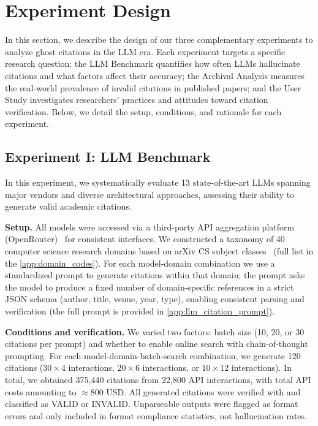 \section{Experiment Design}
\label{subsec:experiment_design}

In this section, we describe the design of our three complementary experiments to analyze ghost citations in the LLM era. Each experiment targets a specific research question: the LLM Benchmark quantifies how often LLMs hallucinate citations and what factors affect their accuracy; the Archival Analysis measures the real-world prevalence of invalid citations in published papers; and the User Study investigates researchers' practices and attitudes toward citation verification. 
Below, we detail the setup, conditions, and rationale for each experiment.

\subsection{Experiment I: LLM Benchmark}
\label{subsec:experiment_i}

In this experiment, we systematically evaluate 13 state-of-the-art LLMs spanning major vendors and diverse architectural approaches, assessing their ability to generate valid academic citations.



\noindent\textbf{Setup.}
All models were accessed via a third-party API aggregation platform (OpenRouter)~\cite{openrouter} for consistent interfaces.
We constructed a taxonomy of 40 computer science research domains based on arXiv CS subject classes~\cite{arxivCSClasses} (full list in the \cref{app:domain_codes}).
For each model-domain combination we use a standardized prompt to generate citations within that domain; the prompt asks the model to produce a fixed number of domain-specific references in a strict JSON schema (author, title, venue, year, type), enabling consistent parsing and verification (the full prompt is provided in \cref{app:llm_citation_prompt}).

\noindent\textbf{Conditions and verification.}
We varied two factors: batch size (10, 20, or 30 citations per prompt) and whether to enable online search with chain-of-thought prompting.
For each model-domain-batch-search combination, we generate 120 citations ($30\times4$ interactions, $20\times6$ interactions, or $10\times12$ interactions).
In total, we obtained 375,440 citations from 22,800 API interactions, with total API costs amounting to $\approx 800$ USD.
All generated citations were verified with \citeb and classified as VALID or INVALID. Unparseable outputs were flagged as format errors and only included in format compliance statistics, not hallucination rates.

